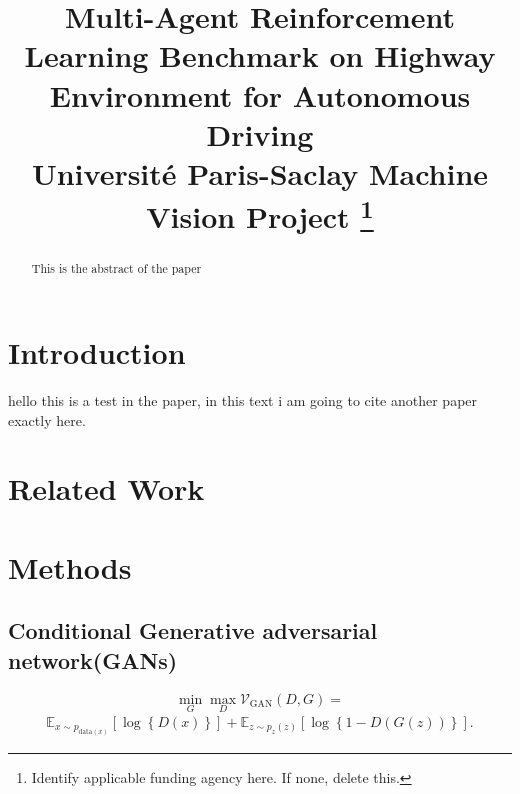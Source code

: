 \documentclass[conference]{IEEEtran}
\begin{document}
\title{Multi-Agent Reinforcement Learning Benchmark on Highway Environment for Autonomous Driving\\
{\footnotesize Université Paris-Saclay Machine Vision Project}
\thanks{Identify applicable funding agency here. If none, delete this.}
}

\author{
}

\maketitle

\begin{abstract}
This is the abstract of the paper
\end{abstract}

\begin{IEEEkeywords}

\end{IEEEkeywords}

\section{Introduction}
hello this is a test in the paper\cite{DBLP:journals/corr/ZhuPIE17}, in this text i am going
to cite another paper exactly here\cite{https://doi.org/10.48550/arxiv.1411.1784}. 

\section{Related Work}


\section{Methods}

\subsection{Conditional Generative adversarial network(GANs)}%


\begin{equation}
\min_{G}\max_{D}\mathcal V_{\text{GAN}}\left(D, G \right) = \end{equation}
\begin{align*}
 \mathbb E_{x \sim p_{\text{data}\left( x\right) }}\left[ \log \left\{ D\left( x \right) \right\} \right] + \mathbb E_{z\sim p_{z}\left( z\right)}\left[ \log\left\{ 1 - D\left( G\left( z\right) \right) \right\}\right].   
\end{align*}
\end{document}
